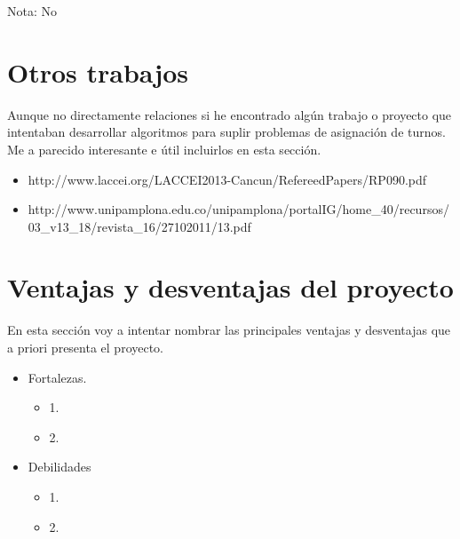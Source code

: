 Nota: No

\section{Otros trabajos}
Aunque no directamente relaciones si he encontrado algún trabajo o proyecto que intentaban desarrollar algoritmos para suplir problemas de asignación de turnos. Me a parecido interesante e útil incluirlos en esta sección.
     \begin{itemize}
         \item http://www.laccei.org/LACCEI2013-Cancun/RefereedPapers/RP090.pdf
         \item http://www.unipamplona.edu.co/unipamplona/portalIG/home_40/recursos/03_v13_18/revista_16/27102011/13.pdf
    \end{itemize}

\section{Ventajas y desventajas del proyecto}

En esta sección voy a intentar nombrar las principales ventajas y desventajas que a priori presenta el proyecto.


\begin{itemize}
    \item Fortalezas.
     \begin{itemize}
         \item 1.
         \item 2.
    \end{itemize}
    \item Debilidades
    \begin{itemize}
         \item 1.
         \item 2.
    \end{itemize}
\end{itemize}
